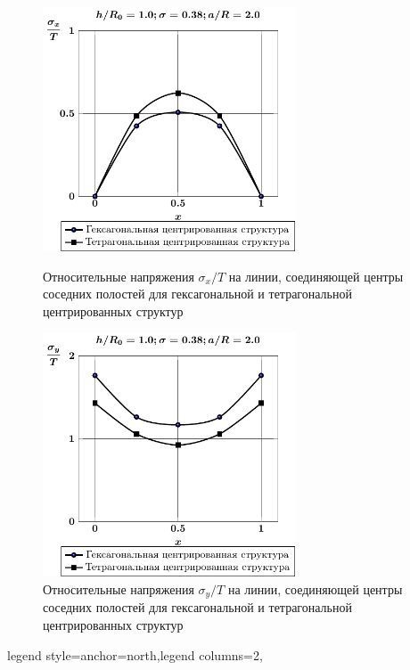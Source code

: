 \begin{figure}[h!]
\centering\footnotesize
\parbox[b]{7.5cm}{\centering\includegraphics[width=7.5cm]{cav7-5-sig_x.pdf}
\caption{Относительные напряжения $\sigma_x/T$ на линии, соединяющей центры соседних полостей для гексагональной и тетрагональной центрированных структур
\label{f:7:25}}}\hfil\hfil
\parbox[b]{7.5cm}{\centering\includegraphics[width=7.5cm]{cav7-5-sig_y.pdf}
\caption{Относительные напряжения $\sigma_y/T$ на линии, соединяющей центры соседних полостей для гексагональной и тетрагональной центрированных структур
\label{f:7:26}}}
\end{figure}

legend style={anchor=north,legend columns=2},